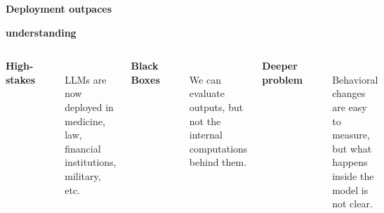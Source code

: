 \documentclass[aspectratio=169,11pt]{beamer}
\newcommand{\ghost}[1]{{\color{paper}#1}}
\begin{document}
\begin{frame}[plain]
  \vspace*{0pt}
  {\color{ink}\fontsize{22}{24}\selectfont\textbf{Deployment outpaces}\par}
  \vspace{-0.06cm}
  {\color{ink}\fontsize{22}{24}\selectfont\textbf{understanding}\par}

  \vspace{0.8cm}
  \begin{columns}[T,totalwidth=\textwidth]
    {\Large\color{ink}\textbf{High-stakes}}\\[0.16cm]
    {\color{muted}\rule{\linewidth}{0.35pt}}\\[0.16cm]
    {\normalsize\color{inktwo}LLMs are now deployed in medicine, law, financial institutions, military, etc.}

    {\Large\color{ink}\textbf{Black Boxes}}\\[0.16cm]
    {\color{muted}\rule{\linewidth}{0.35pt}}\\[0.16cm]
    {\normalsize\color{inktwo}We can evaluate outputs, but not the internal computations behind them.}

    {\Large\ghost{\textbf{Deeper problem}}}\\[0.16cm]
    {\ghost{\rule{\linewidth}{0.35pt}}}\\[0.16cm]
    {\normalsize\ghost{Behavioral changes are easy to measure, but what happens inside the model is not clear.}}
  \end{columns}
\end{frame}
\end{document}

